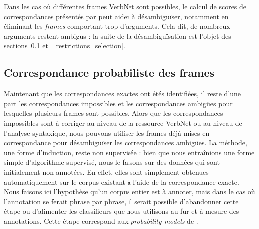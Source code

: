 Dans les cas où différentes frames VerbNet sont possibles, le calcul de scores
de correspondances présentés par \cite{swier2004unsupervised} peut aider à
désambiguïser, notamment en éliminant les \textit{frames} comportant trop
d'arguments. Cela dit, de nombreux arguments restent ambigus : la suite de la
désambiguïsation est l'objet des sections~\ref{subsec:probability} et
~\ref{restrictions_selection}.





\subsection{Correspondance probabiliste des frames}
\label{subsec:probability}

Maintenant que les correspondances exactes ont étés identifiées, il reste d'une
part les correspondances impossibles et les correspondances ambigües pour
lesquelles plusieurs frames sont possibles. Alors que les correspondances
impossibles sont à corriger au niveau de la ressource VerbNet ou au niveau de
l'analyse syntaxique, nous pouvons utiliser les frames déjà mises en
correspondance pour désambiguïser les correspondances ambigües. La méthode, une
forme d'induction, reste non supervisée : bien que nous entraînions une forme
simple d'algorithme supervisé, nous le faisons sur des données qui sont
initialement non annotées.  En effet, elles sont simplement obtenues
automatiquement sur le corpus existant à l'aide de la correspondance exacte.
Nous faisons ici l'hypothèse qu'un corpus entier est à annoter, mais dans le
cas où l'annotation se ferait phrase par phrase, il serait possible
d'abandonner cette étape ou d'alimenter les classifieurs que nous utilisons au
fur et à mesure des annotations. Cette étape correspond aux \textit{probability
models} de \citet{swier2004unsupervised}.

